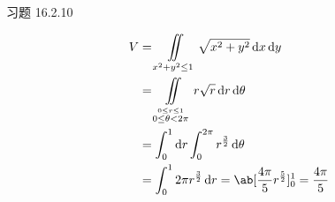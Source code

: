 \begin{problem}
	习题 16.2.10
	\begin{solution}
		$$
		\begin{aligned}
			V & = \iint\limits_{x^2 + y^2 \le 1} \sqrt{x^2 + y^2} \dd{x} \dd{y} \\
			& = \iint\limits_{\stackrel{0 \le r \le 1}{0 \le \theta < 2\pi}} r \sqrt{r} \dd{r} \dd{\theta} \\
			& = \int_{0}^{1} \dd{r} \int_{0}^{2\pi} r^{\frac{3}{2}} \dd{\theta} \\
			& = \int_{0}^{1} 2 \pi r^{\frac{3}{2}} \dd{r} = \ab[\frac{4\pi}{5} r^{\frac{5}{2}}]_{0}^{1} = \frac{4\pi}{5}
		\end{aligned}
		$$
	\end{solution}
\end{problem}

